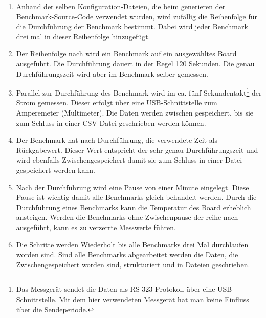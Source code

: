 \begin{enumerate}
\item Anhand der selben Konfiguration-Dateien, die beim generieren der Benchmark-Source-Code verwendet wurden, wird zufällig die Reihenfolge für die Durchführung der Benchmark bestimmt. Dabei wird jeder Benchmark drei mal in dieser Reihenfolge hinzugefügt.
\item Der Reihenfolge nach wird ein Benchmark auf ein ausgewähltes Board ausgeführt. Die Durchführung dauert in der Regel 120 Sekunden. Die genau Durchführungszeit wird aber im Benchmark selber gemessen.
\item Parallel zur Durchführung des Benchmark wird im ca. fünf Sekundentakt\footnote{Das Messgerät sendet die Daten als RS-323-Protokoll über eine USB-Schnittstelle. Mit dem hier verwendeten Messgerät hat man keine Einfluss über die Sendeperiode.} der Strom gemessen. Dieser erfolgt über eine USB-Schnittstelle zum Amperemeter (Multimeter). Die Daten werden zwischen gespeichert, bis sie zum Schluss in einer CSV-Datei geschrieben werden können.
\item Der Benchmark hat nach Durchführung, die verwendete Zeit als Rückgabewert. Dieser Wert entspricht der sehr genau Durchführungszeit und wird ebenfalls Zwischengespeichert damit sie zum Schluss in einer Datei gespeichert werden kann.
\item Nach der Durchführung wird eine Pause von einer Minute eingelegt. Diese Pause ist wichtig damit alle Benchmarks gleich behandelt werden. Durch die Durchführung eines Benchmarks kann die Temperatur des Board erheblich ansteigen. Werden die Benchmarks ohne Zwischenpause der reihe nach ausgeführt, kann es zu verzerrte Messwerte führen.
\item Die Schritte werden Wiederholt bis alle Benchmarks drei Mal durchlaufen worden sind. Sind alle Benchmarks abgearbeitet werden die Daten, die Zwischengespeichert worden sind, strukturiert und in Dateien geschrieben.
\end{enumerate}